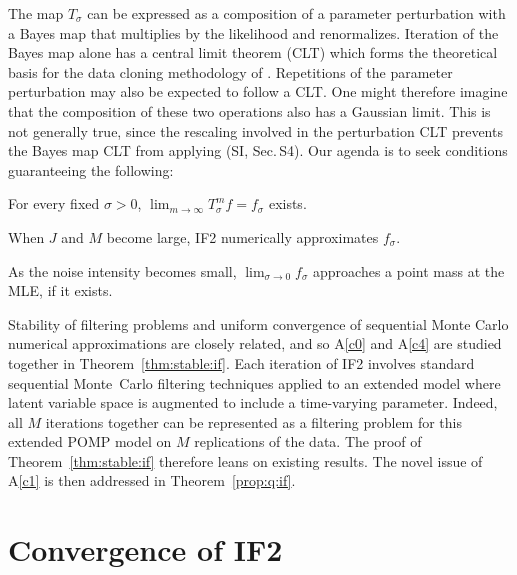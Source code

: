 \documentclass{pnastwo}\usepackage[]{graphicx}\usepackage[]{color}
\newcommand\secConjugacy{S4}
\newcommand\mySection{{Sec.$\,$}}
\newcommand\listA{A}
\newcommand\IF{IF2}
\newcommand{\conditionList}{ %
\setlength{\topsep}{1mm} \setlength{\itemsep}{0.5mm} \setlength{\parsep}{0cm}}
\begin{document}
\begin{article}
The map $T_\sigma$ can be expressed as a composition of a parameter perturbation with a Bayes map that multiplies by the likelihood and renormalizes.
Iteration of the Bayes map alone has a central limit theorem (CLT) \cite{lele07} which forms the theoretical basis for the data cloning methodology of \cite{lele07,lele10}.
Repetitions of the parameter perturbation may also be expected to follow a CLT. 
One might therefore imagine that the composition of these two operations also has a Gaussian limit. 
This is not generally true, since the rescaling involved in the perturbation CLT prevents the Bayes map CLT from applying (SI, {\mySection}{\secConjugacy}).
Our agenda is to seek conditions guaranteeing the following:
\begin{list}{(\listA{})}{\conditionList}
\item\label{c0} For every fixed $\sigma>0$, $\lim_{m\to\infty}T_\sigma^mf=f_\sigma$ exists. 
\item\label{c4} When $J$ and $M$ become large,  {\IF} numerically approximates $f_\sigma$. 
\item\label{c1} As the noise intensity becomes small, $\lim_{\sigma\to 0}f_\sigma$ approaches a point mass at the MLE, if it exists.
\end{list}
Stability of filtering problems and uniform convergence of sequential Monte Carlo numerical approximations are closely related, and so \listA\ref{c0} and \listA\ref{c4} are studied together in Theorem~\ref{thm:stable:if}.
Each iteration of  {\IF} involves standard sequential Monte~Carlo filtering techniques applied to an extended model where latent variable space is augmented to include a time-varying parameter. 
Indeed, all $M$ iterations together can be represented as a filtering problem for this extended POMP model on $M$ replications of the data.
The proof of Theorem~\ref{thm:stable:if} therefore leans on existing results.
The novel issue of \listA\ref{c1} is then addressed in Theorem~\ref{prop:q:if}.


\section{Convergence of IF2}\label{sec:mle:if}


\end{article}
\end{document}
